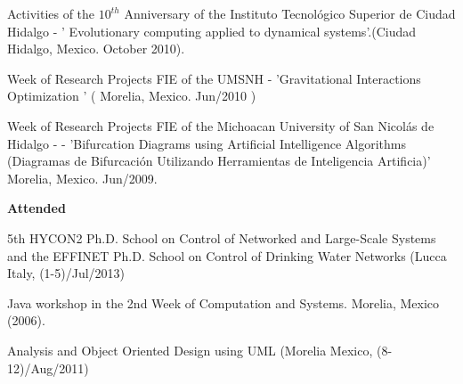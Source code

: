 \documentclass[10pt]{article}
\newenvironment{innerlist}[1][\enskip\textbullet]%
        {\begin{compactitem}[#1]}{\end{compactitem}}
\newcommand{\blankline}{\quad\pagebreak[2]}
\begin{document}
\begin{innerlist}
\item Activities of the $10^{th}$ Anniversary of the Instituto Tecnológico Superior de Ciudad Hidalgo - ' Evolutionary computing applied to dynamical systems'.(Ciudad Hidalgo, Mexico. October 2010).
\item Week of Research Projects FIE of the UMSNH - 'Gravitational Interactions Optimization ' ( Morelia, Mexico. Jun/2010 )

\item Week of Research Projects FIE of the Michoacan University of San Nicolás de Hidalgo - - 'Bifurcation Diagrams using Artificial Intelligence Algorithms (Diagramas de Bifurcación Utilizando Herramientas de Inteligencia Artificia)' {Morelia, Mexico. Jun/2009}.

\end{innerlist}

\blankline


\textbf{Attended}
\begin{innerlist}
\item 5th HYCON2 Ph.D. School on Control of Networked and Large-Scale Systems and the EFFINET Ph.D. School on Control of Drinking Water Networks  (Lucca Italy, (1-5)/Jul/2013)
\item Java workshop in the 2nd Week of Computation and Systems.  {Morelia, Mexico (2006).}
\item Analysis and Object Oriented Design using UML  (Morelia Mexico,  (8-12)/Aug/2011)

\end{innerlist}
\end{document}
